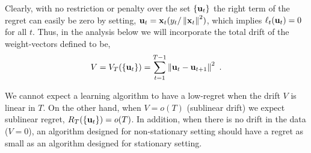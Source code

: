 Clearly, with no restriction or penalty over the set $\{\mathbf{u}_{t}\}$ the right term of
the regret can easily be zero by setting, $\mathbf{u}_{t} = \mathbf{x}_{t}
(y_{t}/\left\Vert {\mathbf{x}_{t}} \right\Vert^2)$, which implies $\ell_t(\mathbf{u}_{t})=0$ for all
$t$.
Thus, in the analysis below we will incorporate the total drift
of the weight-vectors defined to be,
\begin{align*}
V = V_T(\{\mathbf{u}_{t}\}) = \sum_{t=1}^{T-1} \left\Vert {\mathbf{u}_{t}-\mathbf{u}_{t+1}} \right\Vert^2 ~.
\end{align*}

We cannot expect a learning algorithm to have a low-regret 
when the drift $V$ is linear in $T$. On the other hand, when $V=o(T)$ (sublinear drift) 
we expect sublinear regret, $R_T(\{\mathbf{u}_{t}\})=o(T)$. In addition, when there is no drift in the data ($V=0$), 
an algorithm designed for non-stationary setting should have a regret as small as an algorithm designed for stationary setting.  